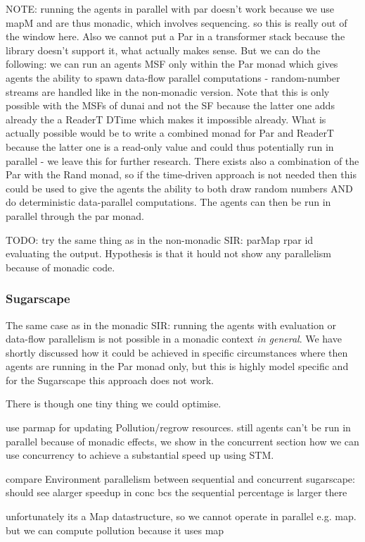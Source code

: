 NOTE: running the agents in parallel with par doesn't work because we use mapM and are thus monadic, which involves sequencing. so this is really out of the window here. Also we cannot put a Par in a transformer stack because the library doesn't support it, what actually makes sense. But we can do the following: we can run an agents MSF only within the Par monad which gives agents the ability to spawn data-flow parallel computations - random-number streams are handled like in the non-monadic version. Note that this is only possible with the MSFs of dunai and not the SF because the latter one adds already the a ReaderT DTime which makes it impossible already. 
What is actually possible would be to write a combined monad for Par and ReaderT because the latter one is a read-only value and could thus potentially run in parallel - we leave this for further research. There exists also a combination of the Par with the Rand monad, so if the time-driven approach is not needed then this could be used to give the agents the ability to both draw random numbers AND do deterministic data-parallel computations. The agents can then be run in parallel through the par monad.

TODO: try the same thing as in the non-monadic SIR: parMap rpar id evaluating the output. Hypothesis is that it hould not show any parallelism because of monadic code.

\subsubsection{Sugarscape}
The same case as in the monadic SIR: running the agents with evaluation or data-flow parallelism is not possible in a monadic context  \textit{in general}. We have shortly discussed how it could be achieved in specific circumstances where then agents are running in the Par monad only, but this is highly model specific and for the Sugarscape this approach does not work. 

There is though one tiny thing we could optimise.

use parmap for updating Pollution/regrow resources. still agents can't be run in parallel because of monadic effects, we show in the concurrent section how we can use concurrency to achieve a substantial speed up using STM.

compare Environment parallelism between sequential and concurrent sugarscape: should see alarger speedup in conc bcs the sequential percentage is larger there

unfortunately its a Map datastructure, so we cannot operate in parallel e.g. map. but we can compute pollution because it uses map



